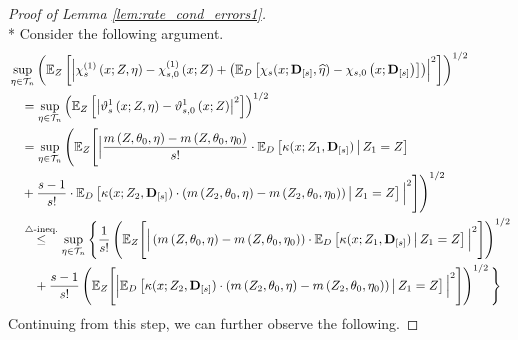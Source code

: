 \begin{proof}[Proof of Lemma \ref{lem:rate_cond_errors1}]\mbox{}\\*
    Consider the following argument.
    \begin{equation}
        \begin{aligned}
            & \sup_{\eta \in \mathcal{T}_{n}}\left(
                \mathbb{E}_{Z}\left[
                    \left|\chi_{s}^{(1)}\left(x; Z, \eta\right) 
                    - \chi_{s,0}^{(1)}\left(x; Z\right)
                    + \left(\mathbb{E}_{D}\left[\chi_{s}(x; \mathbf{D}_{[s]}, \widehat{\eta}) - \chi_{s,0}\left(x; \mathbf{D}_{[s]}\right)\right]\right)
                    \right|^2
                \right]
            \right)^{1 / 2} \\
            & \quad = \sup_{\eta \in \mathcal{T}_{n}}\left(
                \mathbb{E}_{Z}\left[\left|\vartheta_{s}^{1}\left(x; Z, \eta\right)
            - \vartheta_{s,0}^{1}\left(x; Z\right) \right|^{2}\right]
            \right)^{1 / 2}\\
            & \quad = \sup_{\eta \in \mathcal{T}_{n}}\Bigg(
                \mathbb{E}_{Z}\Bigg[\Big|
                \frac{m\left(Z, \theta_{0}, \eta\right) - m\left(Z, \theta_{0}, \eta_{0}\right)}{s!} \cdot \mathbb{E}_{D}\left[\kappa(x; Z_{1}, \mathbf{D}_{[s]}) \, \middle| \, Z_1 = Z \right]  \\
            & \quad + \frac{s-1}{s!} \cdot \mathbb{E}_{D}\left[\kappa(x; Z_{2}, \mathbf{D}_{[s]})\cdot \left(m\left(Z_{2}, \theta_{0}, \eta\right)
            - m\left(Z_{2}, \theta_{0}, \eta_{0}\right)\right) \, \middle| \, Z_1 = Z \right] 
            \Big|^{2}\Bigg]
            \Bigg)^{1 / 2}\\
            & \quad \overset{\triangle\text{-ineq.}}{\leq} \sup_{\eta \in \mathcal{T}_{n}}\Bigg\{
                \frac{1}{s!} \left(\mathbb{E}_{Z}\Bigg[\Big|\left(m\left(Z, \theta_{0}, \eta\right) - m\left(Z, \theta_{0}, \eta_{0}\right)\right) \cdot \mathbb{E}_{D}\left[\kappa(x; Z_{1}, \mathbf{D}_{[s]}) \, \middle| \, Z_1 = Z \right] \Big|^{2}\Bigg]\right)^{1/2}\\
                & \quad \quad + \frac{s-1}{s!} \left(\mathbb{E}_{Z}\Bigg[\Big|\mathbb{E}_{D}\left[\kappa(x; Z_{2}, \mathbf{D}_{[s]})\cdot \left(m\left(Z_{2}, \theta_{0}, \eta\right)
            - m\left(Z_{2}, \theta_{0}, \eta_{0}\right)\right) \, \middle| \, Z_1 = Z \right]\Big|^{2}\Bigg]\right)^{1/2}\Bigg\}
        \end{aligned}
    \end{equation}
    Continuing from this step, we can further observe the following.

\end{proof}

